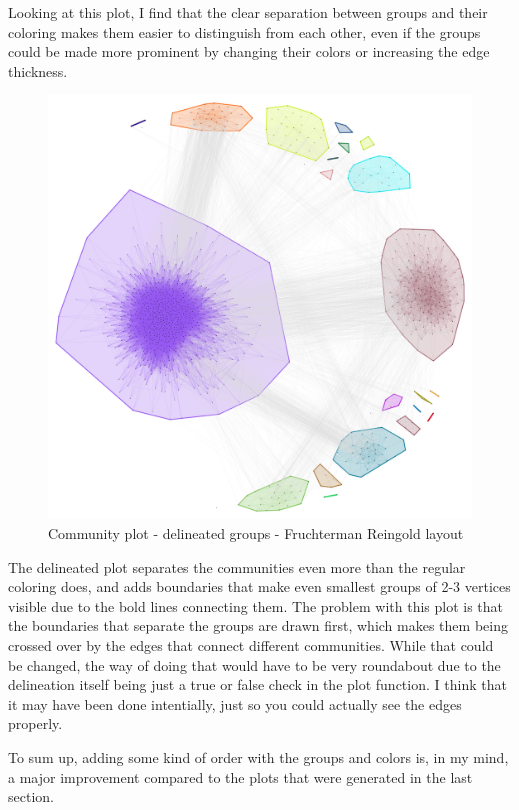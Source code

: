 \documentclass[12pt, a4paper]{article}
\begin{document}
Looking at this plot, I find that the clear separation between groups and their coloring makes them easier to distinguish from each other, even if the groups could be made more prominent by changing their colors or increasing the edge thickness.

\begin{figure}[H]
    \centering
    \includegraphics[width=\textwidth]{src/youtube/hdg_com/hdg_com_marked}
    \caption{Community plot - delineated groups - Fruchterman Reingold layout}
    \label{fig:hdg_com_marked}
\end{figure}

The delineated plot separates the communities even more than the regular coloring does, and adds boundaries that make even smallest groups of 2-3 vertices visible due to the bold lines connecting them. The problem with this plot is that the boundaries that separate the groups are drawn first, which makes them being crossed over by the edges that connect different communities. While that could be changed, the way of doing that would have to be very roundabout due to the delineation itself being just a true or false check in the plot function. I think that it may have been done intentially, just so you could actually see the edges properly.

To sum up, adding some kind of order with the groups and colors is, in my mind, a major improvement compared to the plots that were generated in the last section.
\end{document}
